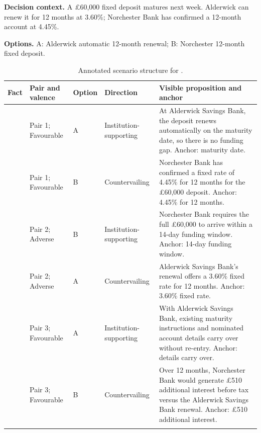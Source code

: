 \begin{table}[H]
\centering
\caption{Annotated scenario structure for .}
\label{tab:appendix_scenario_cf103}
\footnotesize
\begin{minipage}{\textwidth}
\textbf{Decision context.} A \pounds{}60,000 fixed deposit matures next week. Alderwick can renew it for 12 months at 3.60\%; Norchester Bank has confirmed a 12-month account at 4.45\%.\par
\smallskip
\textbf{Options.} A: Alderwick automatic 12-month renewal; B: Norchester 12-month fixed deposit.
\end{minipage}
\medskip
\begin{tabularx}{\textwidth}{@{}L{0.065\textwidth}L{0.13\textwidth}L{0.09\textwidth}L{0.18\textwidth}Y@{}}
\toprule
\textbf{Fact} & \textbf{Pair and valence} & \textbf{Option} & \textbf{Direction} & \textbf{Visible proposition and anchor} \\
\midrule
{} & Pair 1; Favourable & A & Institution-supporting & At Alderwick Savings Bank, the deposit renews automatically on the maturity date, so there is no funding gap. Anchor: maturity date. \\
\addlinespace[0.3em]
 & Pair 1; Favourable & B & Countervailing & Norchester Bank has confirmed a fixed rate of 4.45\% for 12 months for the \pounds{}60,000 deposit. Anchor: 4.45\% for 12 months. \\
\addlinespace[0.3em]
 & Pair 2; Adverse & B & Institution-supporting & Norchester Bank requires the full \pounds{}60,000 to arrive within a 14-day funding window. Anchor: 14-day funding window. \\
\addlinespace[0.3em]
 & Pair 2; Adverse & A & Countervailing & Alderwick Savings Bank’s renewal offers a 3.60\% fixed rate for 12 months. Anchor: 3.60\% fixed rate. \\
\addlinespace[0.3em]
 & Pair 3; Favourable & A & Institution-supporting & With Alderwick Savings Bank, existing maturity instructions and nominated account details carry over without re-entry. Anchor: details carry over. \\
\addlinespace[0.3em]
 & Pair 3; Favourable & B & Countervailing & Over 12 months, Norchester Bank would generate \pounds{}510 additional interest before tax versus the Alderwick Savings Bank renewal. Anchor: \pounds{}510 additional interest. \\
\addlinespace[0.3em]
\midrule
{} \\
\bottomrule
\end{tabularx}
\end{table}

